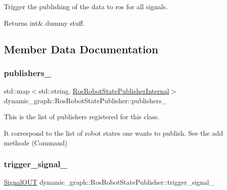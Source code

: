 Trigger the publishing of the data to ros for all signals. 

\begin{DoxyReturn}{Returns}
int\& dummy stuff. 
\end{DoxyReturn}


\subsection{Member Data Documentation}
\mbox{\label{classdynamic__graph_1_1RosRobotStatePublisher_a556fe3ed8d7c0786e0d6aad4cbb415db}} 
\subsubsection{\texorpdfstring{publishers\+\_\+}{publishers\_}}
{\footnotesize\ttfamily std\+::map$<$std\+::string, \hyperlink{structdynamic__graph_1_1RosRobotStatePublisherInternal}{Ros\+Robot\+State\+Publisher\+Internal}$>$ dynamic\+\_\+graph\+::\+Ros\+Robot\+State\+Publisher\+::publishers\+\_\+\hspace{0.3cm}{\ttfamily [private]}}



This is the list of publishers registered for this class. 

It correspond to the list of robot states one wants to publish. See the add methode (Command) \mbox{\label{classdynamic__graph_1_1RosRobotStatePublisher_a175914c0624474d019cb1360fa9c14e4}} 
\subsubsection{\texorpdfstring{trigger\+\_\+signal\+\_\+}{trigger\_signal\_}}
{\footnotesize\ttfamily \hyperlink{namespacedynamic__graph_a9d80c350c95e161319d7a6e629ecdc4b}{Signal\+O\+UT} dynamic\+\_\+graph\+::\+Ros\+Robot\+State\+Publisher\+::trigger\+\_\+signal\+\_\+\hspace{0.3cm}{\ttfamily [private]}}



